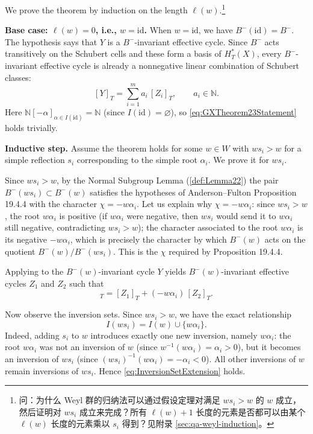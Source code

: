 \begin{Proof}\label{pf:GXTheorem23}

We prove the theorem by induction on the length $\ell(w)$.\footnote{问：为什么 Weyl 群的归纳法可以通过假设定理对满足 $ws_i > w$ 的 $w$ 成立，然后证明对 $ws_i$ 成立来完成？所有 $\ell(w)+1$ 长度的元素是否都可以由某个 $\ell(w)$ 长度的元素乘以 $s_i$ 得到？见附录 \cref{sec:qa-weyl-induction}。}

\medskip
\noindent\textbf{Base case: $\ell(w) = 0$, i.e., $w = \mathrm{id}$.} When $w = \mathrm{id}$, we have $B^-(\mathrm{id}) = B^-$. The hypothesis says that $Y$ is a $B^-$-invariant effective cycle. Since $B^-$ acts transitively on the Schubert cells and these form a basis of $H_T^*(X)$, every $B^-$-invariant effective cycle is already a nonnegative linear combination of Schubert classes:
$$[Y]_T = \sum_{i=1}^m a_i\,[Z_i]_T,\qquad a_i \in \mathbb{N}.$$
Here $\mathbb{N}[-\alpha]_{\alpha \in I(\mathrm{id})} = \mathbb{N}$ (since $I(\mathrm{id}) = \varnothing$), so \cref{eq:GXTheorem23Statement} holds trivially.

\medskip
\noindent\textbf{Inductive step.} Assume the theorem holds for some $w \in W$ with $ws_i > w$ for a simple reflection $s_i$ corresponding to the simple root $\alpha_i$. We prove it for $ws_i$.

Since $ws_i > w$, by the Normal Subgroup Lemma (\cref{def:Lemma22}) the pair $B^-(ws_i) \subset B^-(w)$ satisfies the hypotheses of Anderson--Fulton Proposition 19.4.4 \cite{AndersonFulton} with the character $\chi = -w\alpha_i$. Let us explain why $\chi = -w\alpha_i$: since $ws_i > w$, the root $w\alpha_i$ is positive (if $w\alpha_i$ were negative, then $ws_i$ would send it to $w\alpha_i$ still negative, contradicting $ws_i > w$); the character associated to the root $w\alpha_i$ is its negative $-w\alpha_i$, which is precisely the character by which $B^-(w)$ acts on the quotient $B^-(w)/B^-(ws_i)$. This is the $\chi$ required by Proposition 19.4.4.

Applying \cite[Proposition 19.4.4]{AndersonFulton} to the $B^-(w)$-invariant cycle $Y$ yields $B^-(w)$-invariant effective cycles $Z_1$ and $Z_2$ such that
\begin{equation}
[Y]_T = [Z_1]_T + (-w\alpha_i)\,[Z_2]_T.
\label{eq:Prop194Applied}
\end{equation}

Now observe the inversion sets. Since $ws_i > w$, we have the exact relationship
\begin{equation}
I(ws_i) = I(w) \cup \{w\alpha_i\}.
\label{eq:InversionSetExtension}
\end{equation}
Indeed, adding $s_i$ to $w$ introduces exactly one new inversion, namely $w\alpha_i$: the root $w\alpha_i$ was not an inversion of $w$ (since $w^{-1}(w\alpha_i) = \alpha_i > 0$), but it becomes an inversion of $ws_i$ (since $(ws_i)^{-1}(w\alpha_i) = -\alpha_i < 0$). All other inversions of $w$ remain inversions of $ws_i$. Hence \cref{eq:InversionSetExtension} holds.


\end{Proof}
